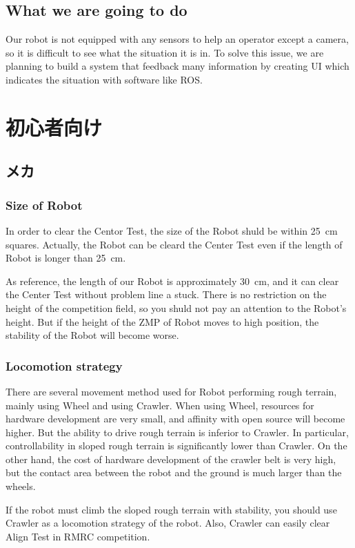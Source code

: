 \documentclass[journal]{IEEEtran}
\begin{document}
\subsection{What we are going to do}
Our robot is not equipped with any sensors to help an operator except a camera, so it is difficult to see what the situation it is in.
To solve this issue, we are planning to build a system that feedback many information by creating UI which indicates the situation with software like ROS.

\section{初心者向け}
\subsection{メカ}
\subsubsection{Size of Robot}
In order to clear the Centor Test, the size of the Robot shuld be within \SI{25}{\cm} squares.
Actually, the Robot can be cleard the Center Test even if the length of Robot is longer than \SI{25}{\cm}.

As reference, the length of our Robot is approximately \SI{30}{\cm}, and it can clear the Center Test without problem line a stuck.
There is no restriction on the height of the competition field, so you shuld not pay an attention to the Robot's height. But if the height of the ZMP of Robot moves to high position, the stability of the Robot will become worse.

\subsubsection{Locomotion strategy}
There are several movement method used for Robot performing rough terrain, mainly using Wheel and using Crawler.
When using Wheel, resources for hardware development are very small, and affinity with open source will become higher.
But the ability to drive rough terrain is inferior to Crawler.
In particular, controllability in sloped rough terrain is significantly lower than Crawler.
On the other hand, the cost of hardware development of the crawler belt is very high, but the contact area between the robot and the ground is much larger than the wheels.

If the robot must climb the sloped rough terrain with stability, you should use Crawler as a locomotion strategy of the robot.
Also, Crawler can easily clear Align Test in RMRC competition.
\end{document}
